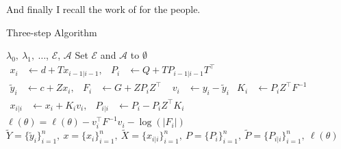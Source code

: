 \documentclass[titlepage]{article}
\begin{document}
And finally I recall the work of \citep{simon2013sparse} for the people.

\begin{algorithm}
  \caption{Three-step Algorithm\label{alg:kalman}}
  \begin{algorithmic}
     $\lambda_0,\ \lambda_1,\ \dots$, $\mathcal{E}$, $\mathcal{A}$
    \STATE Set $\mathcal{E}$ and $\mathcal{A}$ to $\emptyset$ 
    \STATE $\begin{aligned} x_{i}
      &\leftarrow d + T x_{i-1|i-1}, & P_i &\leftarrow Q + T P_{i-1|i-1}
      T^\top\end{aligned}$ 
    \STATE $\begin{aligned}\widetilde{y}_i
      &\leftarrow c + Z  x_i, & F_i &\leftarrow G + Z P_i
      Z^\top\end{aligned}$ 
    \STATE $\begin{aligned}v_i&\leftarrow y_i-\widetilde{y}_i& K_i&
      \leftarrow P_i Z^\top F^{-1}\end{aligned}$ 
    \STATE $\begin{aligned} x_{i|i}
      &\leftarrow  x_i + K_i v_i, & P_{i|i} &\leftarrow P_i - P_iZ^\top
      K_i\end{aligned}$ 
    \STATE $\ell(\theta) = \ell(\theta) -v_i^\top F^{-1}v_i - \log(|F_i|)$
    \ENDFOR
    \RETURN $\widetilde{Y}=\{\widetilde{y}_i\}_{i=1}^n,\  x=\{ x_i\}_{i=1}^n,\
    \widetilde{X}=\{x_{i|i}\}_{i=1}^n,\ P=\{P_i\}_{i=1}^n,\
    \widetilde{P}=\{P_{i|i}\}_{i=1}^n,\ \ell(\theta)$
  \end{algorithmic}
\end{algorithm}



\end{document}
